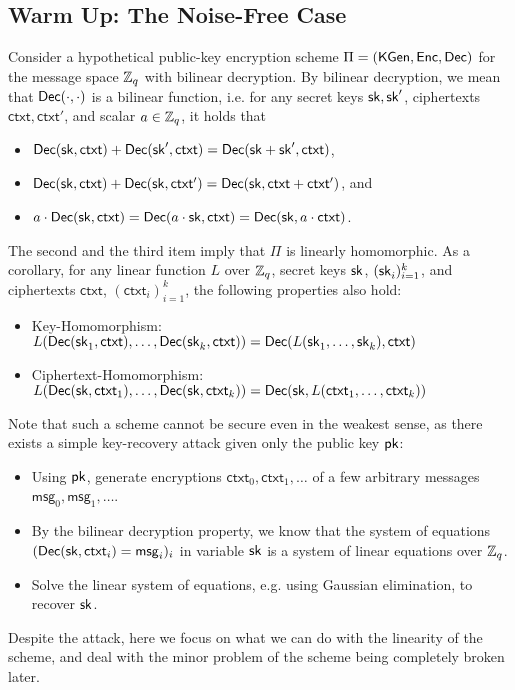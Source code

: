 \documentclass[10pt,twoside]{article}
\newcommand{\msg}{\mathsf{msg}}
\newcommand{\ctxt}{\mathsf{ctxt}}
\begin{document}
\subsection{Warm Up: The Noise-Free Case}

Consider a hypothetical public-key encryption scheme $\Pi = (\mathsf{KGen}, \mathsf{Enc}, \mathsf{Dec})$ for the message space $\mathbb{Z}_q$ with bilinear decryption.
By bilinear decryption, we mean that $\mathsf{Dec}(\cdot, \cdot)$ is a bilinear function, i.e. for any secret keys $\sk, \sk'$, ciphertexts $\ctxt, \ctxt'$, and scalar $a \in \mathbb{Z}_q$, it holds that
\begin{itemize}
    \item $\dec(\sk, \ctxt) + \dec(\sk', \ctxt) = \dec(\sk + \sk', \ctxt)$,
    \item $\dec(\sk, \ctxt) + \dec(\sk, \ctxt') = \dec(\sk, \ctxt + \ctxt')$, and
    \item $a \cdot \dec(\sk, \ctxt) = \dec(a \cdot \sk, \ctxt) = \dec(\sk, a \cdot \ctxt)$.
\end{itemize}
The second and the third item imply that $\Pi$ is linearly homomorphic.
As a corollary, for any linear function $L$ over $\mathbb{Z}_q$, secret keys $\sk$, $(\sk_i)_{i=1}^k$, and ciphertexts $\ctxt$, $(\ctxt_i)_{i=1}^k$, the following properties also hold:
\begin{itemize}
    \item Key-Homomorphism: $L(\dec(\sk_1, \ctxt), \ldots, \dec(\sk_k, \ctxt)) = \dec(L(\sk_1,\ldots,\sk_k), \ctxt)$
    \item Ciphertext-Homomorphism: $L(\dec(\sk, \ctxt_1), \ldots, \dec(\sk, \ctxt_k)) = \dec(\sk, L(\ctxt_1, \ldots, \ctxt_k))$
\end{itemize}
Note that such a scheme cannot be secure even in the weakest sense, as there exists a simple key-recovery attack given only the public key $\pk$:
\begin{itemize}
    \item Using $\pk$, generate encryptions $\ctxt_0, \ctxt_1, \ldots$ of a few arbitrary messages $\msg_0, \msg_1, \ldots$.
    \item By the bilinear decryption property, we know that the system of equations $(\dec(\sk, \ctxt_i) = \msg_i)_i$ in variable $\sk$ is a system of linear equations over $\mathbb{Z}_q$.
    \item Solve the linear system of equations, e.g. using Gaussian elimination, to recover $\sk$.
\end{itemize}
Despite the attack, here we focus on what we can do with the linearity of the scheme, and deal with the minor problem of the scheme being completely broken later.
\end{document}
